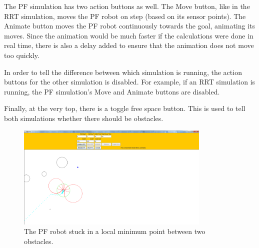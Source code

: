 \documentclass[12pt]{article}
\begin{document}
The PF simulation has two action buttons as well. The Move button, like in the RRT simulation, moves the PF robot on step (based on its sensor points). The Animate button moves the PF robot continuously towards the goal, animating its moves. Since the animation would be much faster if the calculations were done in real time, there is also a delay added to ensure that the animation does not move too quickly.

In order to tell the difference between which simulation is running, the action buttons for the other simulation is disabled. For example, if an RRT simulation is running, the PF simulation's Move and Animate buttons are disabled.

Finally, at the very top, there is a toggle free space button. This is used to tell both simulations whether there should be obstacles.


\begin{figure}
\centering
\includegraphics[width=350]{two_obstacles.png}
\caption{The PF robot stuck in a local minimum point between two obstacles.}
\end{figure}
\end{document}

